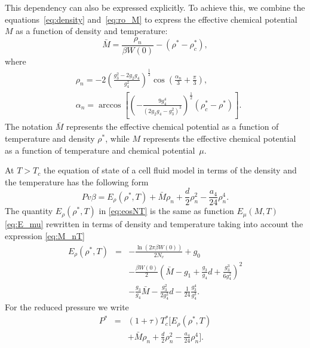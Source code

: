 This dependency can also be expressed explicitly. To achieve this, we combine the equations~\eqref{eq:density} and~\eqref{eq:ro_M} to express the effective chemical potential $M$ as a function of density and temperature:
\begin{equation}\label{eq:M_nT}
	\bar M = \frac{\rho_{n}}{\beta W(0)} - (\rho^* - \rho^*_c),
\end{equation}
where
\begin{align} \label{eq:ro_nT}
	& \rho_{n} = - 2 \left(\frac{g_3^2 - 2g_2 g_4}{g_4^2} \right)^{\frac{1}{2}} \cos \left( \frac{\alpha_n}{3} + \frac{\pi}{3} \right), \\
	& \alpha_n = \arccos \left[ \left( - \frac{9 g_4^4}{\left( 2 g_2 g_4 - g_3^2\right)^3}\right)^{\frac{1}{2}} (\rho^*_c - \rho^*)\right]. \nonumber 
\end{align}
The notation $\bar{M}$ represents the effective chemical potential as a function of temperature and density $\rho^*$, while $M$ represents the effective chemical potential as a function of temperature and chemical potential~$\mu$.

At $T>T_c$ the equation of state of a cell fluid model in terms of the density and the temperature has the following form
\begin{equation}\label{eq:eosNT}
	Pv\beta = E_\rho (\rho^*,T) + \bar M \rho_{n} + \frac{d}{2} \rho_{n}^2 - \frac{a_4}{24} \rho_{n}^4.
\end{equation}
The quantity $E_\rho (\rho^*, T)$ in \eqref{eq:eosNT} is the same as function $E_\mu (M,T)$ \eqref{eq:E_mu} rewritten in terms of density and temperature taking into account the expression \eqref{eq:M_nT}
\begin{eqnarray}\label{eq:E_nu}
	E_\rho (\rho^*, T) & = & - \frac{\ln (2\pi \beta W(0))}{2 N_v}  +  g_0 
	\nonumber\\
	&& - \frac{\beta W(0)}{2} 
	\left(\bar{M} - g_1 + \frac{g_3}{g_4} d + \frac{g_3^3}{6g_4^2} \right)^{2} 
	\nonumber\\
	&& - \frac{g_3}{g_4} {\bar{M}} - \frac{g_3^2}{2 g_4^2}  d - \frac{1}{24} \frac{g_3^4}{g_4^3}. 
\end{eqnarray}
For the reduced pressure we write
\begin{eqnarray}
	\label{eq:eosPTn_reduced}
	P^* & = & (1 + \tau)T^*_c \bigg[ E_\rho (\rho^*,T) 
	\nonumber\\
	&& + \bar{M} \rho_{n} + \frac{d}{2} \rho_{n}^2 - \frac{a_4}{24} \rho_{n}^4\bigg].
\end{eqnarray}

